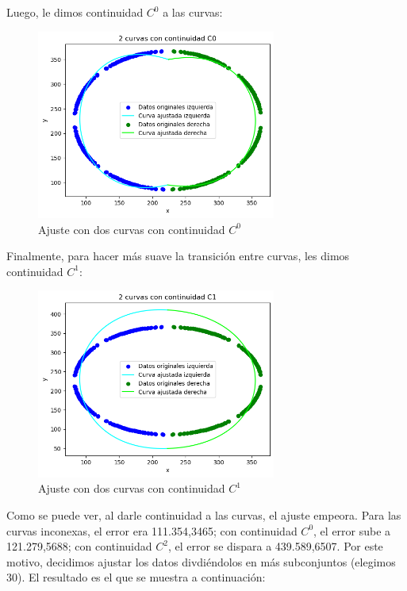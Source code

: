 \documentclass{article}
\begin{document}
Luego, le dimos continuidad $C^0$ a las curvas:

\begin{figure}[H]
    \centering
    \includegraphics[width=0.7\textwidth]{Imagenes/2_c0.png}
    \caption{Ajuste con dos curvas con continuidad $C^0$}
\end{figure}

Finalmente, para hacer más suave la transición entre curvas, les dimos continuidad $C^1$:

\begin{figure}[H]
    \centering
    \includegraphics[width=0.7\textwidth]{Imagenes/2_c1.png}
    \caption{Ajuste con dos curvas con continuidad $C^1$}
\end{figure}

Como se puede ver, al darle continuidad a las curvas, el ajuste empeora. Para las curvas inconexas, el error era 111.354,3465; con continuidad $C^0$, el error sube a 121.279,5688; con continuidad $C^2$, el error se dispara a 439.589,6507. Por este motivo, decidimos ajustar los datos divdiéndolos en más subconjuntos (elegimos 30). El resultado es el que se muestra a continuación:
\end{document}
